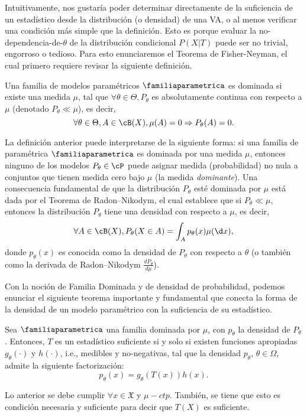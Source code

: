 Intuitivamente, nos gustaría poder determinar directamente de la suficiencia de un estadístico desde la distribución (o densidad) de una VA, o al menos verificar una condición más simple que la definición. Esto es porque evaluar la no-dependencia-de-$\theta$ de la distribución condicional $P(X|T)$ puede ser no trivial, engorroso o tedioso. Para esto enunciaremos el Teorema de Fisher-Neyman, el cual primero requiere revisar la siguiente definición. 

\begin{definition}
	Una familia de modelos paramétricos $\familiaparametrica$ es dominada si existe una medida $\mu$, tal que $\forall \theta\in\Theta, P_\theta$ es absolutamente continua con respecto a $\mu$ (denotado $ P_\theta \ll \mu$), es decir, 
	\begin{equation}
	\nonumber
		\forall \theta\in\Theta, A\in\cB(X), \mu(A)=0 \Rightarrow P_\theta(A) = 0.
	\end{equation}
\end{definition}

La definición anterior puede interpretarse de la siguiente forma: si una familia de paramétrica $\familiaparametrica$ es dominada por una medida $\mu$, entonces ninguno de los modelos $P_\theta\in\cP$ puede asignar medida (probabilidad) no nula a conjuntos que tienen medida cero bajo $\mu$ (la medida \textit{dominante}). Una consecuencia fundamental de que la distribución $P_\theta$ esté dominada por $\mu$ está dada por el Teorema de Radon–Nikodym,  el cual establece que si $ P_\theta \ll \mu$, entonces la distribución $P_\theta$ tiene una densidad con respecto a $\mu$, es decir,	
	\begin{equation}
	\nonumber
		\forall A\in\cB(X), P_\theta(X\in A) = \int _A p_\theta(x) \mu(\d x),
	\end{equation}
donde $p_\theta(x)$ es conocida como la densidad de $P_\theta$ con respecto a $\theta$ (o también como la derivada de Radon–Nikodym  $\frac{d P_\theta}{d \mu}$).

Con la noción de Familia Dominada y de densidad de probabilidad, podemos enunciar el siguiente teorema importante y fundamental que conecta la forma de la densidad de un modelo paramétrico con la suficiencia de su estadístico. 

\begin{theorem}
	\label{teo:neyman-fisher}
	
	Sea $\familiaparametrica$  una familia dominada por $\mu$, con $p_\theta$ la densidad de $P_\theta$. Entonces, $T$ es un estadístico suficiente si y solo si existen funciones apropiadas $g_\theta(\cdot)$ y $h(\cdot)$, i.e., medibles y no-negativas, tal que la densidad $p_\theta$, $\theta\in\Omega$, admite la siguiente factorización: 
	\begin{equation}
		\label{eq:neyman-fisher}
		p_\theta (x) = g_\theta(T(x))h(x).
	\end{equation}

    Lo anterior se debe cumplir $\forall x\in\mathfrak{X}$ y $\mu-ctp$. También, se tiene que esto es condición necesaria y suficiente para decir que $T(X)$ es suficiente.
\end{theorem}

